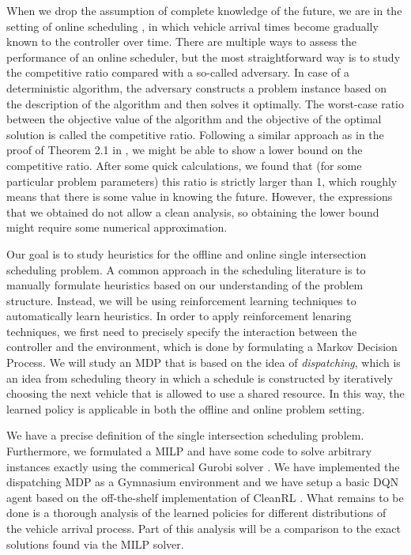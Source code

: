 \documentclass{article}
\theoremstyle{definition}
\theoremstyle{plain}
\begin{document}

When we drop the assumption of complete knowledge of the future, we are in the
setting of online scheduling \cite{vestjensOnlineMachineScheduling1997}, in which vehicle arrival times
become gradually known to the controller over time. There are multiple ways to
assess the performance of an online scheduler, but the most straightforward way
is to study the competitive ratio compared with a so-called adversary. In case
of a deterministic algorithm, the adversary constructs a problem instance based
on the description of the algorithm and then solves it optimally. The worst-case
ratio between the objective value of the algorithm and the objective of the
optimal solution is called the competitive ratio. Following a similar approach
as in the proof of Theorem 2.1 in \cite{vestjensOnlineMachineScheduling1997}, we might be able to show a
lower bound on the competitive ratio. After some quick calculations, we found
that (for some particular problem parameters) this ratio is strictly larger than
1, which roughly means that there is some value in knowing the future. However,
the expressions that we obtained do not allow a clean analysis, so obtaining the
lower bound might require some numerical approximation.


Our goal is to study heuristics for the offline and online single intersection
scheduling problem. A common approach in the scheduling literature is to
manually formulate heuristics based on our understanding of the problem
structure. Instead, we will be using reinforcement learning techniques to
automatically learn heuristics. In order to apply reinforcement lenaring
techniques, we first need to precisely specify the interaction between the
controller and the environment, which is done by formulating a Markov Decision
Process. We will study an MDP that is based on the idea of \textit{dispatching},
which is an idea from scheduling theory in which a schedule is constructed by
iteratively choosing the next vehicle that is allowed to use a shared resource.
In this way, the learned policy is applicable in both the offline and online
problem setting.


We have a precise definition of the single intersection scheduling problem.
Furthermore, we formulated a MILP and have some code to solve arbitrary
instances exactly using the commerical Gurobi solver \cite{gurobi}. We have
implemented the dispatching MDP as a Gymnasium \cite{towers_gymnasium_2023}
environment and we have setup a basic DQN \cite{mnihHumanlevelControlDeep2015}
agent based on the off-the-shelf implementation of CleanRL
\cite{huang2022cleanrl}. What remains to be done is a thorough analysis of the
learned policies for different distributions of the vehicle arrival process.
Part of this analysis will be a comparison to the exact solutions found via the
MILP solver.
\end{document}

